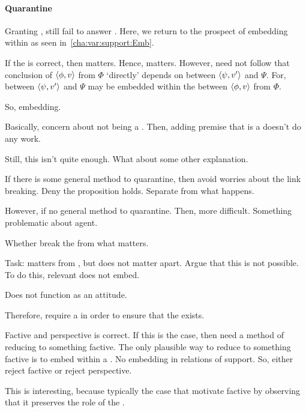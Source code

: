 \paragraph{Quarantine}

\begin{note}
  Granting \agpe{}, still fail to answer \qWhyVnP{}.
  Here, we return to the prospect of embedding  within  as seen in~\autoref{cha:var:support:Emb}.

  If the \agpe{} is correct, then \fc{} matters.
  Hence, \ros{} matters.
  However, need not follow that conclusion of \(\langle \phi, v \rangle\) from \(\Phi\) `directly' depends on \ros{} between \(\langle \psi, v' \rangle\) and \(\Psi\).
  For, \ros{} between \(\langle \psi, v' \rangle\) and \(\Psi\) may be embedded within the \ros{} between \(\langle \phi, v \rangle\) from \(\Phi\).
\end{note}

\begin{note}
  So, embedding.

  Basically, concern about not being a \fc{}.
  Then, adding premise that is a \fc{} doesn't do any work.
\end{note}

\begin{note}
  Still, this isn't quite enough.
  What about some other explanation.

  If there is some general method to quarantine, then avoid worries about the link breaking.
  Deny the proposition holds.
  Separate \agpe{} from what happens.

  However, if no general method to quarantine.
  Then, more difficult.
  Something problematic about agent.

  Whether break the \agpe{} from what matters.

  Task: \fc{} matters from \agpe{}, but does not matter apart.
  Argue that this is not possible.
  To do this, relevant \fc{} does not embed.

  Does not function as an attitude.
\end{note}

\begin{note}
  Therefore, require a \wit{} in order to ensure that the \ros{} exists.
\end{note}

\begin{note}
  Factive and perspective is correct.
  If this is the case, then need a method of reducing to something factive.
  The only plausible way to reduce to something factive is to embed within a \ros{}.
  No embedding in relations of support.
  So, either reject factive or reject perspective.

  This is interesting, because typically the case that motivate factive by observing that it preserves the role of the \agpe{}.
\end{note}

